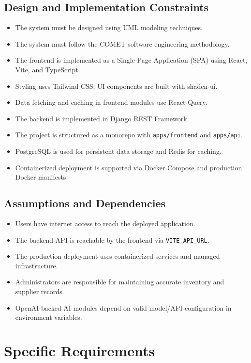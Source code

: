 \documentclass[12pt]{article}
\begin{document}
\subsection{Design and Implementation Constraints}

\begin{itemize}
\item The system must be designed using UML modeling techniques.
\item The system must follow the COMET software engineering methodology.
\item The frontend is implemented as a Single-Page Application (SPA) using React, Vite, and TypeScript.
\item Styling uses Tailwind CSS; UI components are built with shadcn-ui.
\item Data fetching and caching in frontend modules use React Query.
\item The backend is implemented in Django REST Framework.
\item The project is structured as a monorepo with \texttt{apps/frontend} and \texttt{apps/api}.
\item PostgreSQL is used for persistent data storage and Redis for caching.
\item Containerized deployment is supported via Docker Compose and production Docker manifests.
\end{itemize}

\subsection{Assumptions and Dependencies}

\begin{itemize}
\item Users have internet access to reach the deployed application.
\item The backend API is reachable by the frontend via \texttt{VITE\_API\_URL}.
\item The production deployment uses containerized services and managed infrastructure.
\item Administrators are responsible for maintaining accurate inventory and supplier records.
\item OpenAI-backed AI modules depend on valid model/API configuration in environment variables.
\end{itemize}

\section{Specific Requirements}
\end{document}
